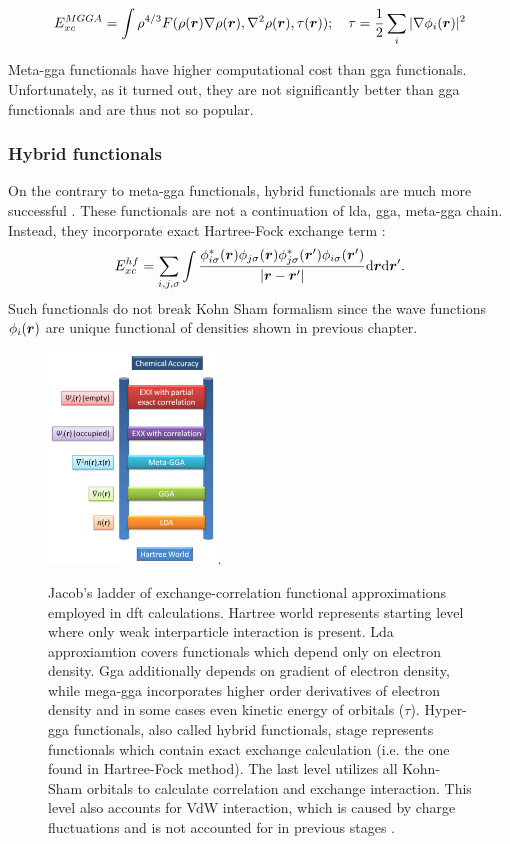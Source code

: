 \documentclass[openany, longbibliography,slovene,a4paper,12pt]{article}
\def\vec#1{\mbox{\boldmath$#1$}}
\newcommand{\dif}{\mathrm{d}}
\begin{document}
\begin{equation}
  E_{xc}^{MGGA}= \int \rho^{4/3}F(\rho(\vec r) \nabla \rho(\vec r), \nabla^2 \rho(\vec r), \tau(\vec r)); \quad \tau=\frac{1}{2}\sum_i |\nabla \phi_i(\vec r)|^2
   \end{equation}

Meta-gga functionals have higher computational cost than gga functionals.
Unfortunately, as it turned out, they are not significantly better than gga
functionals and are thus not so popular.


\subsubsection{Hybrid functionals}
On the contrary to meta-gga functionals, hybrid functionals are much more
successful \cite{challenges_den_fun_theor}. These functionals are not a
continuation of lda, gga, meta-gga chain. Instead, they incorporate exact
Hartree-Fock exchange term \cite{challenges_den_fun_theor}:
\begin{equation}
  E^{hf}_{xc}=\sum_ {i,j,\sigma}\int\frac{\phi^*_{i\sigma}(\vec r) \phi_{j\sigma}(\vec r) \phi^*_{j\sigma}(\vec r') \phi_{i\sigma}(\vec r')}{|\vec r - \vec r'|}\dif \vec r \dif \vec r'.
\end{equation}
Such functionals do not break Kohn Sham formalism since the wave functions
$\phi_i(\vec r)$ are unique functional of densities shown in previous chapter.


\begin{figure}[!ht]
  \centering
  \includegraphics[width=0.4\textwidth]{jacobs_functional_ladder_ver2.png}.
  \caption{Jacob’s ladder of exchange-correlation functional approximations
    employed in dft calculations. Hartree world represents starting level where only
    weak interparticle interaction is present. Lda approxiamtion covers
    functionals which depend only on electron density. Gga additionally depends
    on gradient of electron density, while mega-gga incorporates higher order
    derivatives of electron density and in some cases even kinetic energy of
    orbitals ($\tau$). Hyper-gga functionals, also called hybrid functionals,
    stage represents functionals which contain exact exchange calculation (i.e.
    the one found in Hartree-Fock method). The last level utilizes all Kohn-Sham
    orbitals to calculate correlation and exchange interaction. This level also
    accounts for VdW interaction, which is caused by charge fluctuations and is
    not accounted for in previous stages \cite{How_theo_simul_can_address}.
  }
  \label{bijection}
\end{figure}
\end{document}

